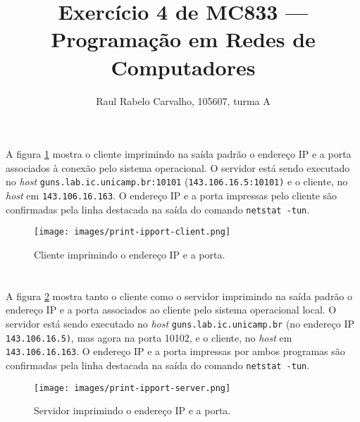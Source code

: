 \documentclass[a4paper,10pt,oneside,final,titlepage,onecolumn]{article}
\title{Exercício 4 de MC833 --- Programação em Redes de Computadores}
\author{Raul Rabelo Carvalho, 105607, turma A}
\begin{document}
\maketitle



\section{}
\paragraph{}A figura \ref{print-ipport-client} mostra o cliente imprimindo na saída padrão o endereço IP e a porta associados à conexão pelo sistema operacional. O servidor está sendo executado no \emph{host} \verb|guns.lab.ic.unicamp.br:10101| (\verb|143.106.16.5:10101)| e o cliente, no \emph{host} em \verb|143.106.16.163|. O endereço IP e a porta impressas pelo cliente são confirmadas pela linha destacada na saída do comando \verb|netstat -tun|.
\begin{figure}[!ht]
  \caption{Cliente imprimindo o endereço IP e a porta.}
  \centering
  \texttt{[image: images/print-ipport-client.png]}
  \label{print-ipport-client}
\end{figure}



\FloatBarrier
\section{}
\paragraph{}A figura \ref{print-ipport-server} mostra tanto o cliente como o servidor imprimindo na saída padrão o endereço IP e a porta associados ao cliente pelo sistema operacional local. O servidor está sendo executado no \emph{host} \verb|guns.lab.ic.unicamp.br| (no endereço IP \verb|143.106.16.5)|, mas agora na porta 10102, e o cliente, no \emph{host} em \verb|143.106.16.163|. O endereço IP e a porta impressas por ambos programas são confirmadas pela linha destacada na saída do comando \verb|netstat -tun|.
\begin{figure}[!ht]
  \caption{Servidor imprimindo o endereço IP e a porta.}
  \centering
  \texttt{[image: images/print-ipport-server.png]}
  \label{print-ipport-server}
\end{figure}
\end{document}
